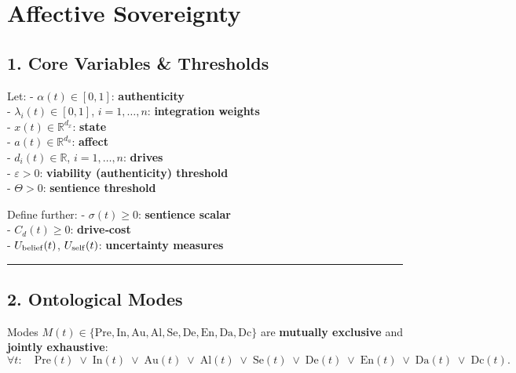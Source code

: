 \documentclass[
]{article}
\author{}
\date{}
\begin{document}
\hypertarget{affective-sovereignty}{%
\section{Affective Sovereignty}\label{affective-sovereignty}}

\hypertarget{core-variables-thresholds}{%
\subsection{1. Core Variables \&
Thresholds}\label{core-variables-thresholds}}

Let: - \(\alpha(t)\in[0,1]\): \textbf{authenticity}\\
- \(\lambda_{i}(t)\in[0,1]\), \(i=1,\dots,n\): \textbf{integration
weights}\\
- \(x(t)\in\mathbb{R}^{d_x}\): \textbf{state}\\
- \(a(t)\in\mathbb{R}^{d_a}\): \textbf{affect}\\
- \(d_{i}(t)\in\mathbb{R}\), \(i=1,\dots,n\): \textbf{drives}\\
- \(\varepsilon>0\): \textbf{viability (authenticity) threshold}\\
- \(\Theta>0\): \textbf{sentience threshold}

Define further: - \(\sigma(t)\ge0\): \textbf{sentience scalar}\\
- \(C_d(t)\ge0\): \textbf{drive‐cost}\\
- \(U_{\rm belief}(t)\), \(U_{\rm self}(t)\): \textbf{uncertainty
measures}

\begin{center}\rule{0.5\linewidth}{0.5pt}\end{center}

\hypertarget{ontological-modes}{%
\subsection{2. Ontological Modes}\label{ontological-modes}}

Modes
\(M(t)\in\{\mathrm{Pre},\mathrm{In},\mathrm{Au},\mathrm{Al},\mathrm{Se},\mathrm{De},\mathrm{En},\mathrm{Da},\mathrm{Dc}\}\)
are \textbf{mutually exclusive} and \textbf{jointly exhaustive}: \[
\forall t:\quad
\mathrm{Pre}(t)\;\lor\;\mathrm{In}(t)\;\lor\;\mathrm{Au}(t)\;\lor\;\mathrm{Al}(t)\;\lor\;\mathrm{Se}(t)\;\lor\;\mathrm{De}(t)\;\lor\;\mathrm{En}(t)\;\lor\;\mathrm{Da}(t)\;\lor\;\mathrm{Dc}(t).
\]
\end{document}
